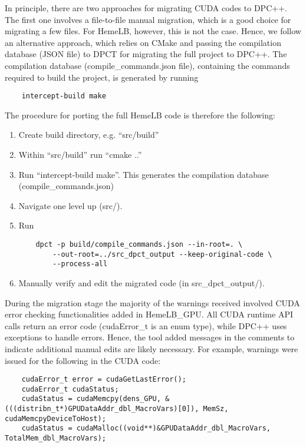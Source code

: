 \documentclass[../main]{subfiles}
\begin{document}
In principle, there are two approaches for migrating CUDA codes to DPC++.
The first one involves a file-to-file manual migration, which is a good choice for migrating a few files.
For HemeLB, however, this is not the case.
Hence, we follow an alternative approach, which relies on CMake and passing the compilation database (JSON file) to DPCT for migrating the full project to DPC++.
The compilation database (compile\_commands.json file), containing the commands required to build the project, is generated by running
\begin{verbatim}
    intercept-build make
\end{verbatim}

The procedure for porting the full HemeLB code is therefore the following:
\begin{enumerate}
	\item Create build directory, e.g. ``src/build''
	\item Within ``src/build'' run ``cmake ..'' %
	\item Run ``intercept-build make''. This generates the compilation database (compile\_commands.json)
	\item Navigate one level up (src/).
	\item Run
	      \begin{verbatim}
    dpct -p build/compile_commands.json --in-root=. \
        --out-root=../src_dpct_output --keep-original-code \
        --process-all
    \end{verbatim}
	\item Manually verify and edit the migrated code (in src\_dpct\_output/).
\end{enumerate}

During the migration stage the majority of the warnings received involved CUDA error checking functionalities added in HemeLB\_GPU.
All CUDA runtime API calls return an error code (cudaError\_t is an enum type), while DPC++ uses exceptions to handle errors.
Hence, the tool added messages in the comments to indicate additional manual edits are likely necessary.
For example, warnings were issued for the following in the CUDA code:
\begin{verbatim}
    cudaError_t error = cudaGetLastError();
    cudaError_t cudaStatus;
    cudaStatus = cudaMemcpy(dens_GPU, &(((distribn_t*)GPUDataAddr_dbl_MacroVars)[0]), MemSz, cudaMemcpyDeviceToHost);
    cudaStatus = cudaMalloc((void**)&GPUDataAddr_dbl_MacroVars, TotalMem_dbl_MacroVars);
\end{verbatim}
\end{document}
